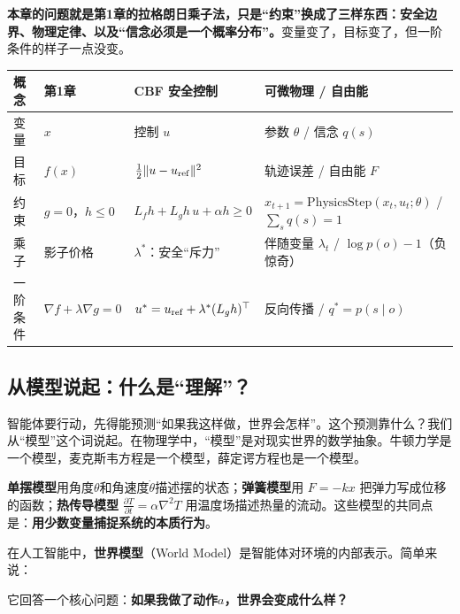 \begin{tcolorbox}[colback=yellow!10, colframe=orange!80, title=本章的核心观点]
\textbf{本章的问题就是第1章的拉格朗日乘子法，只是“约束”换成了三样东西：安全边界、物理定律、以及“信念必须是一个概率分布”。}变量变了，目标变了，但一阶条件的样子一点没变。

\begin{center}
\renewcommand{\arraystretch}{1.3}
\setlength{\tabcolsep}{3pt}
\footnotesize
\begin{tabular}{p{1.0cm}p{2.0cm}p{3.6cm}p{4.3cm}}
\toprule
\textbf{概念} & \textbf{第1章} & \textbf{CBF 安全控制} & \textbf{可微物理 / 自由能} \\
\midrule
变量 & $x$ & 控制 $u$ & 参数 $\theta$ / 信念 $q(s)$ \\
目标 & $f(x)$ & $\tfrac{1}{2}\|u - u_{\rm ref}\|^2$ & 轨迹误差 / 自由能 $F$ \\
约束 & $g = 0$，$h \le 0$ & $L_f h + L_g h\, u + \alpha h \ge 0$ & $x_{t+1} = \mathrm{PhysicsStep}(x_t, u_t; \theta)$ / $\sum_s q(s) = 1$ \\
乘子 & 影子价格 & $\lambda^*$：安全“斥力” & 伴随变量 $\lambda_t$ / $\log p(o) - 1$（负惊奇） \\
一阶条件 & $\nabla f + \lambda \nabla g = 0$ & $u^* = u_{\rm ref} + \lambda^* (L_g h)^\top$ & 反向传播 / $q^* = p(s \mid o)$ \\
\bottomrule
\end{tabular}
\end{center}
\end{tcolorbox}

\subsection{从模型说起：什么是“理解”？}

智能体要行动，先得能预测“如果我这样做，世界会怎样”。这个预测靠什么？我们从“模型”这个词说起。在物理学中，“模型”是对现实世界的数学抽象。牛顿力学是一个模型，麦克斯韦方程是一个模型，薛定谔方程也是一个模型。

\begin{example}[你已经见过很多“模型”]
\textbf{单摆模型}用角度$\theta$和角速度$\dot{\theta}$描述摆的状态；\textbf{弹簧模型}用 $F = -kx$ 把弹力写成位移的函数；\textbf{热传导模型} $\frac{\partial T}{\partial t} = \alpha \nabla^2 T$ 用温度场描述热量的流动。这些模型的共同点是：\textbf{用少数变量捕捉系统的本质行为}。
\end{example}

\begin{definition}[世界模型的直观定义]
在人工智能中，\textbf{世界模型}（World Model）是智能体对环境的内部表示。简单来说：

\begin{center}
\end{center}

它回答一个核心问题：\textbf{如果我做了动作$a$，世界会变成什么样？}
\end{definition}

